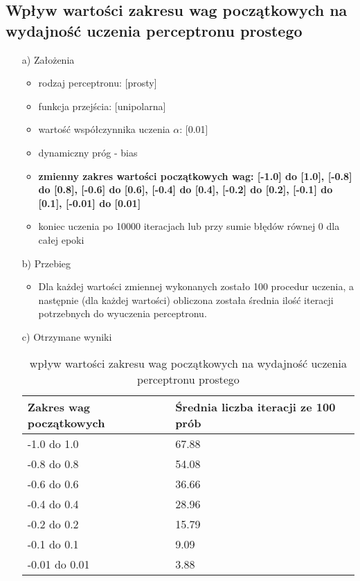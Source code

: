 \documentclass[17pt]{article}
\begin{document}
\subsection{Wpływ wartości zakresu wag początkowych na wydajność uczenia perceptronu prostego}
\vspace{4mm}
\begin{enumerate}

\item[a)] Założenia

\begin{itemize}
\item rodzaj perceptronu: [prosty]
\item funkcja przejścia: [unipolarna]
\item wartość współczynnika uczenia $\alpha$: [0.01]
\item dynamiczny próg - bias
\item \textbf{zmienny zakres wartości początkowych wag: [-1.0] do [1.0], [-0.8] do [0.8], [-0.6] do [0.6], [-0.4] do [0.4], [-0.2] do [0.2], [-0.1] do [0.1], [-0.01] do [0.01]}
\item koniec uczenia po 10000 iteracjach lub przy sumie błędów równej 0 dla całej epoki
\end{itemize}

\item[b)] Przebieg

\begin{itemize}
\item Dla każdej wartości zmiennej wykonanych zostało 100 procedur uczenia, a następnie (dla każdej wartości) obliczona została średnia ilość iteracji potrzebnych do wyuczenia perceptronu.
\end{itemize}
\item[c)] Otrzymane wyniki

\begin{table}[ht]
\centering
\begin{tabular}{|p{4cm}|p{4cm}|}
 \hline
 Zakres wag początkowych & Średnia liczba iteracji ze 100 prób\\ \hline
 -1.0 do 1.0 & 67.88\\ 
 -0.8 do 0.8 & 54.08\\ 
 -0.6 do 0.6 & 36.66\\ 
 -0.4 do 0.4 & 28.96\\ 
 -0.2 do 0.2 & 15.79\\ 
 -0.1 do 0.1 & 9.09\\ 
 -0.01 do 0.01 & 3.88\\ 
 \hline
\end{tabular}
\caption{\label{tab:table2}wpływ wartości zakresu wag początkowych na wydajność uczenia perceptronu prostego}
\end{table}


\end{enumerate}
\end{document}
